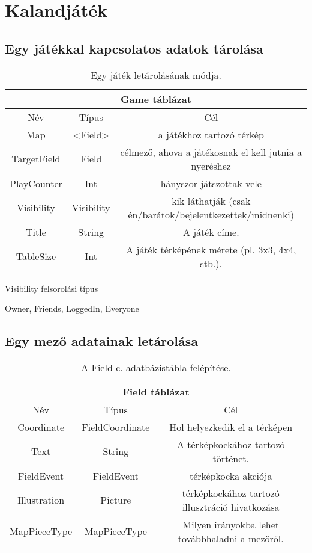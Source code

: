 \section{Kalandjáték}

\subsection{Egy játékkal kapcsolatos adatok tárolása}

\begin{table}[H]
	\centering
	\begin{tabular}{ |c|c|c| }
		\hline
		\multicolumn{3}{|c|}{Game táblázat}\\
		\hline
		Név & Típus & Cél \\
		\hline
		Map  & <Field>  & a játékhoz tartozó térkép  \\
		\hline
		TargetField & Field & célmező, ahova a játékosnak el kell jutnia a nyeréshez\\
		\hline
		PlayCounter & Int & hányszor játszottak vele\\
		\hline
		Visibility & Visibility & kik láthatják \newline (csak én/barátok/bejelentkezettek/midnenki)\\
		\hline
		Title & String & A játék címe. \\
		\hline
		TableSize & Int & A játék térképének mérete (pl. 3x3, 4x4, stb.).\\
		\hline
	\end{tabular}
	\caption[Game adatbázistábla felépítése]{Egy játék letárolásának módja.}
	\label{tab:game}
\end{table}

Visibility felsorolási típus
\begin{compactitem}
	\item Owner, Friends, LoggedIn, Everyone
\end{compactitem}

\subsection{Egy mező adatainak letárolása}

\begin{table}[H]
	\centering
	\begin{tabular}{ |c|c|c| }
		\hline
		\multicolumn{3}{|c|}{Field táblázat}\\
		\hline
		Név & Típus & Cél \\
		\hline
		Coordinate  & FieldCoordinate  & Hol helyezkedik el a térképen  \\
		\hline
		Text & String & A térképkockához tartozó történet.\\
		\hline
		FieldEvent & FieldEvent & térképkocka akciója\\
		\hline
		Illustration & Picture & térképkockához tartozó illusztráció hivatkozása\\
		\hline
		MapPieceType & MapPieceType & Milyen irányokba lehet továbbhaladni a mezőről.\\
		\hline
	\end{tabular}
	\caption[Field adatbázistábla]{A Field c. adatbázistábla felépítése.}
	\label{tab:field}
\end{table}

